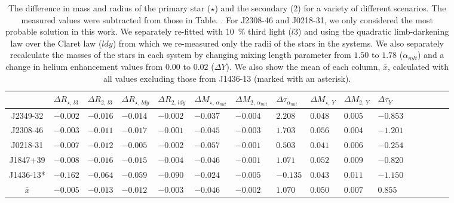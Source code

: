 \begin{sidewaystable*}
\caption{The difference in mass and radius of the primary star ($\star$) and the secondary (2) for a variety of different scenarios. The measured values were subtracted from those in Table. \protect{\ref{EBLMV_orb}}. For J2308-46 and J0218-31, we only considered the most probable solution in this work. We separately re-fitted with 10\, \% third light ($l3$) and using the quadratic limb-darkening law over the Claret law ($ldy$) from which we re-measured only the radii of the stars in the systems. We also separately recalculate the masses of the stars in each system by changing mixing length parameter from $1.50$ to $1.78$ ($\alpha_{mlt}$) and a change in helium enhancement values from $0.00$ to $0.02$ ($\Delta Y$). We also show the mean of each column, $\bar{x}$, calculated with all values excluding those from J1436-13 (marked with an asterisk).}              %
\label{systematic_light_table}      %
\centering                                    %
\begin{tabular}{c l l  l l l l l l l l l l l l l }          %
\hline\hline 
 & $\Delta R_{\star,\, l3}$ & 
 $\Delta R_{2,\, l3}$ 
 &$\Delta R_{\star,\, ldy}$ & 
 $\Delta R_{2,\, ldy}$ 
 
 & $\Delta M_{\star,\, \alpha_{mlt}}$
 & $\Delta M_{2,\, \alpha_{mlt}}$
 & $\Delta \tau_{\alpha_{mlt}}$

 & $\Delta M_{\star,\, Y}$
 & $\Delta M_{2,\, Y}$
 & $\Delta \tau_{Y}$



  \\
\hline

J2349-32 & $-0.002$ & $-0.016$ & $-0.014$ & $-0.002$ & $-0.037$ & $-0.004$ & $2.208$ & $0.048$ & $0.005$ & $-0.853$ & \\

J2308-46 & $-0.003$ & $-0.011$ & $-0.017$ & $-0.001$ & $-0.045$ & $-0.003$ & $1.703$ & $0.056$ & $0.004$ & $-1.201$ & \\

J0218-31 & $-0.007$ & $-0.012$ & $-0.005$ & $-0.002$ & $-0.057$ & $-0.001$ & $0.503$ & $0.041$ & $0.006$ & $-0.254$ \\

J1847+39 & $-0.008$ & $-0.016$ & $-0.015$ & $-0.004$ & $-0.046$ & $-0.001$ & $1.071$ & $0.052$ & $0.009$ &  $-0.820$ \\
	
J1436-13* & $-0.162$ & $-0.064$ & $-0.059$ & $-0.090$ & $-0.024$ & $-0.005$ & $-0.135$ & $0.043$ & $0.011$ & $-1.150$ \\


\hline 
$\bar{x}$ & $-0.005$ & $-0.013$ & $-0.012$ & $-0.003$ & $-0.046$ & $-0.002$  & $1.070$  & $0.050$ & $0.007$ & $0.855$  \\


\hline
\end{tabular}
\end{sidewaystable*}